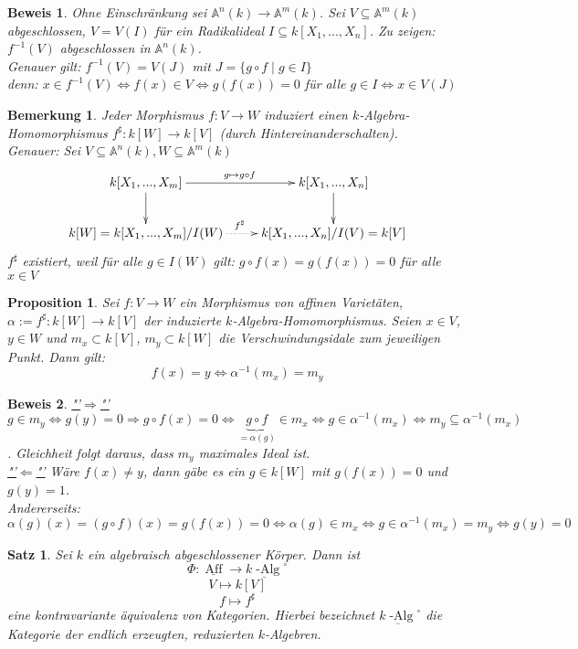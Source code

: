 \documentclass[a4paper,12pt]{report}
\theoremstyle{break}
\newtheorem{Satz}{Satz}
\newtheorem{Bem}[Def]{Bemerkung}
\newtheorem{Prop}[Def]{Proposition}
\theoremstyle{nonumberbreak}
\theoremstyle{nonumberplain}
\newtheorem{Bew}{Beweis}
\begin{document}
\begin{Bew}
Ohne Einschränkung sei $\mathbb{A}^n(k)\rightarrow\mathbb{A}^m(k)$. Sei $V\subseteq \mathbb{A}^m(k)$ abgeschlossen, $V=V(I)$ für ein Radikalideal $I\subseteq k[X_1,...,X_n]$. Zu zeigen: $f^{-1}(V)$ abgeschlossen in $\mathbb{A}^n(k)$.\\
Genauer gilt: $f^{-1}(V)=V(J)$ mit $J=\{g\circ f \mid g\in I\}$\\
denn: $x\in f^{-1}(V) \Leftrightarrow f(x)\in V \Leftrightarrow g(f(x))=0$ für alle $g\in I\Leftrightarrow x\in V(J)$
\end{Bew}
\begin{Bem}
Jeder Morphismus $f:V\rightarrow W$ induziert einen $k$-Algebra-Homomorphismus $f^{\sharp}: k[W]\rightarrow k[V]$ (durch Hintereinanderschalten).\\
Genauer: Sei $V\subseteq \mathbb{A}^n(k), W\subseteq \mathbb{A}^m(k)$
\[
\begin{xy}
\xymatrix{
k[X_1,...,X_m]\ar[d]\ar[r]^{g\mapsto g\circ f}&k[X_1,...,X_n]\ar[d]\\
k[W]=k[X_1,...,X_m]/I(W)\ar@{.>}[r]^{f^{\sharp}}&k[X_1,...,X_n]/I(V)=k[V]
}
\end{xy}
\]
$f^{\sharp}$ existiert, weil für alle $g\in I(W)$ gilt: $g\circ f(x) = g(f(x))=0$ für alle $x\in V$
\end{Bem}
\begin{Prop}
Sei $f: V\rightarrow W$ ein Morphismus von affinen Varietäten, $\alpha:= f^{\sharp}: k[W]\rightarrow k[V]$ der induzierte $k$-Algebra-Homomorphismus. Seien $x\in V$, $y\in W$ und $m_x\subset k[V]$, $m_y\subset k[W]$ die Verschwindungsidale zum jeweiligen Punkt. Dann gilt:
$$f(x)=y\Leftrightarrow \alpha^{-1}(m_x)= m_y$$
\end{Prop}
\begin{Bew}
\underline{"'$\Rightarrow$"'} $g\in m_y \Leftrightarrow g(y)=0\Rightarrow g\circ f(x)=0 \Leftrightarrow \underbrace{g\circ f}_{= \alpha(g)} \in m_x \Leftrightarrow g\in \alpha^{-1}(m_x) \Leftrightarrow m_y \subseteq \alpha^{-1}(m_x)$. Gleichheit folgt daraus, dass $m_y$ maximales Ideal ist.\\
\underline{"'$\Leftarrow$"'} Wäre $f(x)\neq y$, dann gäbe es  ein $g\in k[W]$ mit $g(f(x))=0$ und $g(y)=1$.\\
Andererseits:\\
$\alpha(g)(x)=(g\circ f)(x)=g(f(x))=0\Leftrightarrow \alpha(g)\in m_x \Leftrightarrow g\in \alpha^{-1}(m_x)=m_y \Leftrightarrow g(y)=0$
\end{Bew}
\begin{Satz}
\label{satz:3}
Sei $k$ ein algebraisch abgeschlossener Körper. Dann ist 
$$\Phi:\underline{\operatorname{Aff}} \longrightarrow \underline{k\operatorname{-Alg}}^{\circ}$$
$$V \longmapsto k[V]$$
$$f\longmapsto f^{\sharp}$$
eine kontravariante äquivalenz von Kategorien.
Hierbei bezeichnet $\underline{k\operatorname{-Alg}}^{\circ}$ die Kategorie der endlich erzeugten, reduzierten $k$-Algebren.
\end{Satz}
\end{document}
